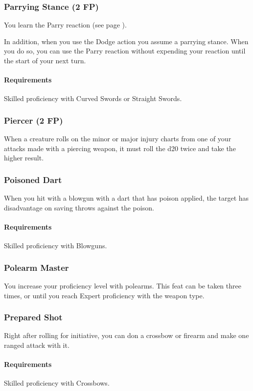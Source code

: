 \subsubsection{Parrying Stance (2 FP)} \label{feat::parryingstance}
    You learn the Parry reaction (see page \pageref{act::parry}).

    In addition, when you use the Dodge action you assume a parrying stance.
    When you do so, you can use the Parry reaction without expending your reaction until the start of your next turn.
    \paragraph{Requirements} Skilled proficiency with Curved Swords or Straight Swords.
\subsubsection{Piercer (2 FP)} \label{feat::piercer}
    When a creature rolls on the minor or major injury charts from one of your attacks made with a piercing weapon, it must roll the d20 twice and take the higher result.
\subsubsection{Poisoned Dart} \label{feat::poisoneddart}
    When you hit with a blowgun with a dart that has poison applied, the target has disadvantage on saving throws against the poison.
    \paragraph{Requirements} Skilled proficiency with Blowguns.
\subsubsection{Polearm Master} \label{feat::polearmmaster}
    You increase your proficiency level with polearms.
    This feat can be taken three times, or until you reach Expert proficiency with the weapon type.
\subsubsection{Prepared Shot} \label{feat::preparedshot}
    Right after rolling for initiative, you can don a crossbow or firearm and make one ranged attack with it.
    \paragraph{Requirements} Skilled proficiency with Crossbows.
